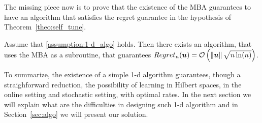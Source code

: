The missing piece now is to prove that the existence of the \ac{MBA} guarantees to have an algorithm that satisfies the regret guarantee in the hypothesis of Theorem~\ref{theo:self_tune}.
\begin{theorem}
Assume that \ref{assumption:1-d_algo} holds.
Then there exists an algorithm, that uses the \ac{MBA} as a subroutine, that guarantees $Regret_n(\boldsymbol{u})=\mathcal{O}\left(\left\|{\boldsymbol{u}}\right\|\sqrt{n \ln(n)}\right)$.
\end{theorem}



To summarize, the existence of a simple 1-d algorithm guarantees, though a straighforward reduction, the possibility of learning in Hilbert spaces, in the online setting and stochastic setting, with optimal rates.
In the next section we will explain what are the difficulties in designing such 1-d algorithm and in Section~\ref{sec:algo} we will present our solution.